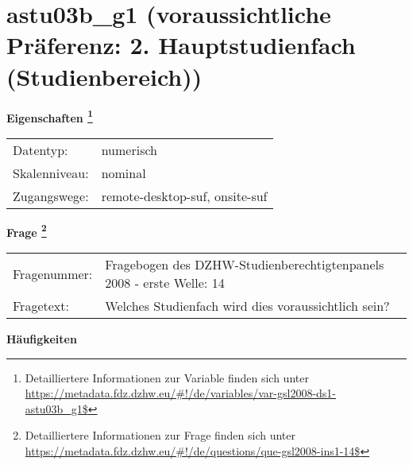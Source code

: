 
    \setcounter{footnote}{0}

    \vspace*{-1.8cm}
	\section{astu03b\_g1 (voraussichtliche Präferenz: 2. Hauptstudienfach (Studienbereich))}
	\label{section:astu03b_g1}



    \vspace*{0.5cm}
    \noindent\textbf{Eigenschaften
	\footnote{Detailliertere Informationen zur Variable finden sich unter
		\url{https://metadata.fdz.dzhw.eu/\#!/de/variables/var-gsl2008-ds1-astu03b_g1$}}}\\
	\begin{tabularx}{\hsize}{@{}lX}
	Datentyp: & numerisch \\
	Skalenniveau: & nominal \\
	Zugangswege: &
	  remote-desktop-suf, 
	  onsite-suf
 \\
    \end{tabularx}



				\vspace*{0.5cm}
                \noindent\textbf{Frage
	                \footnote{Detailliertere Informationen zur Frage finden sich unter
		              \url{https://metadata.fdz.dzhw.eu/\#!/de/questions/que-gsl2008-ins1-14$}}}\\
				\begin{tabularx}{\hsize}{@{}lX}
					Fragenummer: &
					  Fragebogen des DZHW-Studienberechtigtenpanels 2008 - erste Welle:
					  14
 \\
					Fragetext: & Welches Studienfach wird dies voraussichtlich sein? \\
				\end{tabularx}





        		\vspace*{0.5cm}
                \noindent\textbf{Häufigkeiten}

